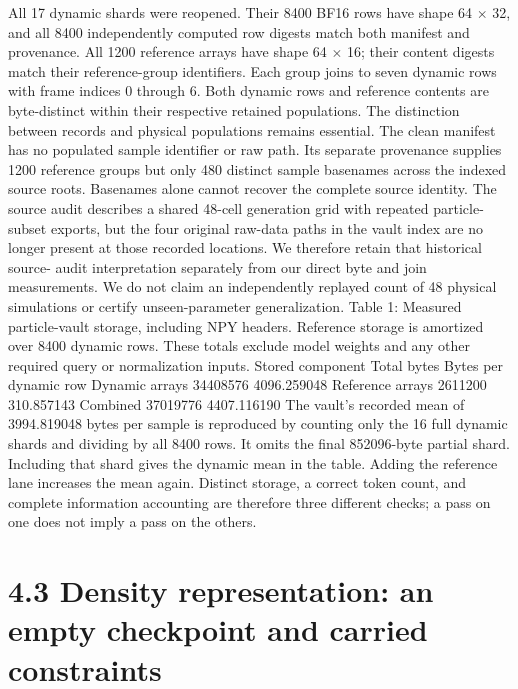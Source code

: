 \documentclass[11pt]{article}
\begin{document}
All 17 dynamic shards were reopened. Their 8400 BF16 rows have shape 64 \ensuremath{\times} 32, and all 8400
independently computed row digests match both manifest and provenance. All 1200 reference
arrays have shape 64 \ensuremath{\times} 16; their content digests match their reference-group identifiers. Each group
joins to seven dynamic rows with frame indices 0 through 6. Both dynamic rows and reference
contents are byte-distinct within their respective retained populations.
The distinction between records and physical populations remains essential. The clean manifest
has no populated sample identifier or raw path. Its separate provenance supplies 1200 reference
groups but only 480 distinct sample basenames across the indexed source roots. Basenames alone
cannot recover the complete source identity. The source audit describes a shared 48-cell generation
grid with repeated particle-subset exports, but the four original raw-data paths in the vault index
are no longer present at those recorded locations. We therefore retain that historical source-
audit interpretation separately from our direct byte and join measurements. We do not claim an
independently replayed count of 48 physical simulations or certify unseen-parameter generalization.
Table 1: Measured particle-vault storage, including NPY headers. Reference storage is amortized
over 8400 dynamic rows. These totals exclude model weights and any other required query or
normalization inputs.
Stored component Total bytes Bytes per dynamic row
Dynamic arrays 34408576 4096.259048
Reference arrays 2611200 310.857143
Combined 37019776 4407.116190
The vault’s recorded mean of 3994.819048 bytes per sample is reproduced by counting only the
16 full dynamic shards and dividing by all 8400 rows. It omits the final 852096-byte partial shard.
Including that shard gives the dynamic mean in the table. Adding the reference lane increases
the mean again. Distinct storage, a correct token count, and complete information accounting are
therefore three different checks; a pass on one does not imply a pass on the others.

\section*{4.3 Density representation: an empty checkpoint and carried constraints}
\end{document}
